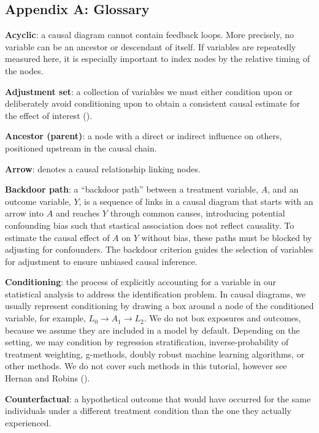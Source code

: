 \documentclass[
  singlecolumn]{article}
\begin{document}
\subsection{Appendix A: Glossary}\label{appendix-a-glossary}

\textbf{Acyclic}: a causal diagram cannot contain feedback loops. More
precisely, no variable can be an ancestor or descendant of itself. If
variables are repeatedly measured here, it is especially important to
index nodes by the relative timing of the nodes.

\textbf{Adjustment set}: a collection of variables we must either
condition upon or deliberately avoid conditioning upon to obtain a
consistent causal estimate for the effect of interest
().

\textbf{Ancestor (parent)}: a node with a direct or indirect influence
on others, positioned upstream in the causal chain.

\textbf{Arrow}: denotes a causal relationship linking nodes.

\textbf{Backdoor path}: a ``backdoor path'' between a treatment
variable, \(A\), and an outcome variable, \(Y\), is a sequence of links
in a causal diagram that starts with an arrow into \(A\) and reaches
\(Y\) through common causes, introducing potential confounding bias such
that stastical association does not reflect causality. To estimate the
causal effect of \(A\) on \(Y\) without bias, these paths must be
blocked by adjusting for confounders. The backdoor criterion guides the
selection of variables for adjustment to ensure unbiased causal
inference.

\textbf{Conditioning}: the process of explicitly accounting for a
variable in our statistical analysis to address the identification
problem. In causal diagrams, we usually represent conditioning by
drawing a box around a node of the conditioned variable, for example,
\(\boxed{L_{0}}\to A_{1} \to L_{2}\). We do not box exposures and
outcomes, because we assume they are included in a model by default.
Depending on the setting, we may condition by regression stratification,
inverse-probability of treatment weighting, g-methods, doubly robust
machine learning algorithms, or other methods. We do not cover such
methods in this tutorial, however see Hernan and Robins
().

\textbf{Counterfactual}: a hypothetical outcome that would have occurred
for the same individuals under a different treatment condition than the
one they actually experienced.
\end{document}
